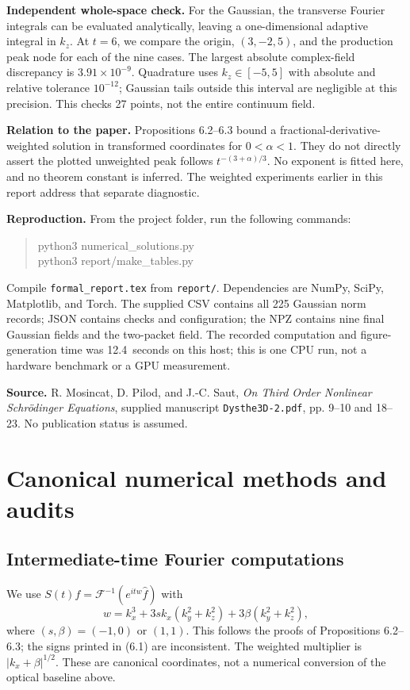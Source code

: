\documentclass[10pt,letterpaper]{article}
\numberwithin{equation}{section}
\newcommand{\QuadError}{$3.91\times10^{-9}$}
\newcommand{\Runtime}{12.4}
\begin{document}
\textbf{Independent whole-space check.} For the Gaussian, the transverse Fourier
integrals can be evaluated analytically, leaving a one-dimensional adaptive integral
in $k_z$. At $t=6$, we compare the origin, $(3,-2,5)$, and the production peak node
for each of the nine cases. The largest absolute complex-field discrepancy is
\QuadError. Quadrature uses $k_z\in[-5,5]$ with absolute and relative tolerance
$10^{-12}$; Gaussian tails outside this interval are negligible at this precision.
This checks 27 points, not the entire continuum field.

\textbf{Relation to the paper.} Propositions 6.2--6.3 bound a fractional-derivative-weighted
solution in transformed coordinates for $0<\alpha<1$. They do not directly assert
the plotted unweighted peak follows $t^{-(3+\alpha)/3}$. No exponent is fitted here,
and no theorem constant is inferred. The weighted experiments earlier in this report address that separate diagnostic.

\textbf{Reproduction.} From the project folder, run the following commands:
\begin{quote}\small\ttfamily
python3 numerical\_solutions.py\\
python3 report/make\_tables.py
\end{quote}
Compile \texttt{formal\_report.tex} from \texttt{report/}. Dependencies are NumPy, SciPy, Matplotlib, and Torch.
The supplied CSV contains all 225 Gaussian norm records; JSON contains checks and
configuration; the NPZ contains nine final Gaussian fields and the two-packet field.
The recorded computation and figure-generation time was \Runtime\ seconds on this
host; this is one CPU run, not a hardware benchmark or a GPU measurement.

\textbf{Source.} R. Mosincat, D. Pilod, and J.-C. Saut,
\emph{On Third Order Nonlinear Schr\"odinger Equations}, supplied manuscript
\texttt{Dysthe3D-2.pdf}, pp. 9--10 and 18--23. No publication status is assumed.

\section{Canonical numerical methods and audits}

\subsection{Intermediate-time Fourier computations}\label{intermediate}
We use $S(t)f=\mathcal F^{-1}(e^{itw}\widehat f)$ with
\begin{equation}w=k_x^3+3s k_x(k_y^2+k_z^2)+3\beta(k_y^2+k_z^2),\end{equation}
where $(s,\beta)=(-1,0)$ or $(1,1)$. This follows the proofs of Propositions
6.2--6.3; the signs printed in (6.1) are inconsistent. The weighted multiplier is
$|k_x+\beta|^{1/2}$. These are canonical coordinates, not a numerical conversion
of the optical baseline above.
\end{document}
